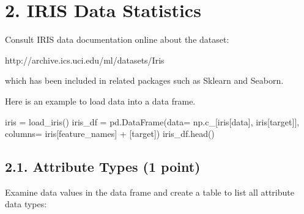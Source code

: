 \documentclass[
  letterpaper,
]{scrbook}
\newenvironment{Shaded}{\begin{snugshade}}{\end{snugshade}}
\newcommand{\NormalTok}[1]{\textcolor[rgb]{0.00,0.23,0.31}{#1}}
\newcommand{\OperatorTok}[1]{\textcolor[rgb]{0.37,0.37,0.37}{#1}}
\newcommand{\StringTok}[1]{\textcolor[rgb]{0.13,0.47,0.30}{#1}}
\begin{document}
\section*{2. IRIS Data Statistics}\label{iris-data-statistics}


Consult IRIS data documentation online about the dataset:

http://archive.ics.uci.edu/ml/datasets/Iris

which has been included in related packages such as Sklearn and Seaborn.

Here is an example to load data into a data frame.

\begin{Shaded}
\begin{Highlighting}[]
\NormalTok{iris }\OperatorTok{=}\NormalTok{ load\_iris()}
\NormalTok{iris\_df }\OperatorTok{=}\NormalTok{ pd.DataFrame(data}\OperatorTok{=}\NormalTok{ np.c\_[iris[}\StringTok{\textquotesingle{}data\textquotesingle{}}\NormalTok{], iris[}\StringTok{\textquotesingle{}target\textquotesingle{}}\NormalTok{]], columns}\OperatorTok{=}\NormalTok{ iris[}\StringTok{\textquotesingle{}feature\_names\textquotesingle{}}\NormalTok{] }\OperatorTok{+}\NormalTok{ [}\StringTok{\textquotesingle{}target\textquotesingle{}}\NormalTok{])}
\NormalTok{iris\_df.head()}
\end{Highlighting}
\end{Shaded}

\subsection*{2.1. Attribute Types (1
point)}\label{attribute-types-1-point}

Examine data values in the data frame and create a table to list all
attribute data types:
\end{document}

